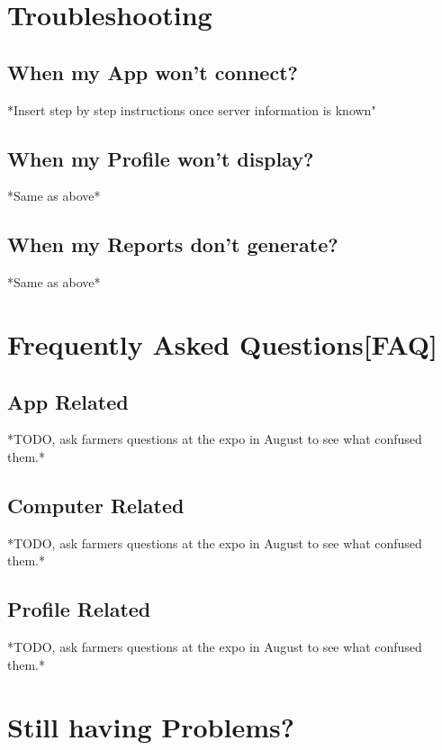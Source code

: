 \documentclass[11pt,fleqn]{book} %
\begin{document}
\chapter{Troubleshooting}
	\section{When my App won't connect?}
		*Insert step by step instructions once server information is known"		
	\section{When my Profile won't display?}
		*Same as above*
	\section{When my Reports don't generate?}
		*Same as above*


\chapter{Frequently Asked Questions[FAQ]}
	\section{App Related}
	*TODO, ask farmers questions at the expo in August to see what confused them.*
	\section{Computer Related}
	*TODO, ask farmers questions at the expo in August to see what confused them.*
	\section{Profile Related}
	*TODO, ask farmers questions at the expo in August to see what confused them.*
	


\chapter{Still having Problems?}
\end{document}
